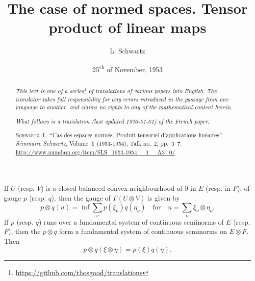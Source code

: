 \documentclass{article}
\title{The case of normed spaces. Tensor product of linear maps}
\author{L. Schwartz}
\date{25\textsuperscript{th} of November, 1953}
\theoremstyle{plain}
\newenvironment{proposition}[1]
    {\renewcommand\theinnercustomproposition{#1}\innercustomproposition}
    {\endinnercustomproposition}
\theoremstyle{definition}
\newcommand{\oldpage}[1]{\marginpar{\footnotesize$\Big\vert$ \textit{p.~#1}}}
\begin{document}
\maketitle
\thispagestyle{fancy}

\renewcommand{\abstractname}{Translator's note.}

\begin{abstract}
  \renewcommand*{\thefootnote}{\fnsymbol{footnote}}
  \emph{This text is one of a series\footnote{\url{https://github.com/thosgood/translations}} of translations of various papers into English.}
  \emph{The translator takes full responsibility for any errors introduced in the passage from one language to another, and claims no rights to any of the mathematical content herein.}
  
  \emph{What follows is a translation (last updated \today) of the French paper:}

  \medskip\noindent
  \textsc{Schwartz, L.}
  ``Cas des espaces norm\'{e}s. Produit tensoriel d'applications lin\'{e}aires''.
  \emph{S\'{e}minaire Schwartz}, Volume~\textbf{1} (1953-1954), Talk no.~2, pp.~3--7.
  {\footnotesize\url{http://www.numdam.org/item/SLS_1953-1954__1__A3_0/}}
\end{abstract}

\setcounter{footnote}{0}



\oldpage{3}
\begin{proposition}{1}
  If $U$ (resp. $V$) is a closed balanced convex neighbourhood of $0$ in $E$ (resp. in $F$), of gauge $p$ (resp. $q$), then the gauge of $\Gamma(U\otimes V)$ is given by
  \[
  \label{equation1}
    p\otimes q(u) = \inf\sum_\nu p(\xi_\nu)q(\eta_\nu)
    \quad\text{for}\quad
    u=\sum_\nu\xi_\nu\otimes\eta_\nu.
  \tag{1}
  \]
  If $p$ (resp. $q$) runs over a fundamental system of continuous seminorms of $E$ (resp. $F$), then the $p\otimes q$ form a fundamental system of continuous seminorms on $E\otimes F$.
  Then
  \[
  \label{equation2}
    p\otimes q(\xi\otimes\eta) = p(\xi)q(\eta).
  \tag{2}
  \]
\end{proposition}
\end{document}
